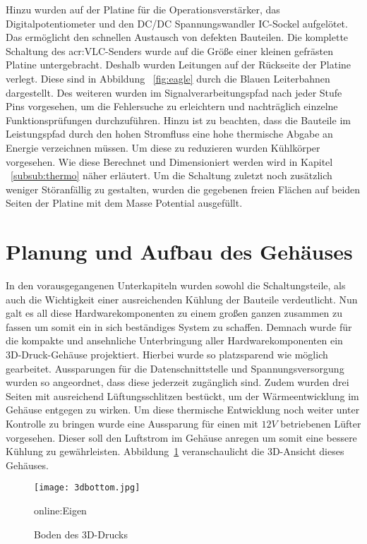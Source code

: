 Hinzu wurden auf der Platine für die Operationsverstärker, das Digitalpotentiometer und den DC/DC Spannungswandler IC-Sockel aufgelötet. Das ermöglicht den schnellen Austausch von defekten Bauteilen. Die komplette Schaltung des \gls{acr:VLC}-Senders wurde auf die Größe einer kleinen gefrästen Platine untergebracht. Deshalb wurden Leitungen auf der Rückseite der Platine verlegt. Diese sind in Abbildung ~\ref{fig:eagle} durch die Blauen Leiterbahnen dargestellt. Des weiteren wurden im Signalverarbeitungspfad nach jeder Stufe Pins vorgesehen, um die Fehlersuche zu erleichtern und nachträglich einzelne Funktionsprüfungen durchzuführen. Hinzu ist zu beachten, dass die Bauteile im Leistungspfad durch den hohen Stromfluss eine hohe thermische Abgabe an Energie verzeichnen müssen. Um diese zu reduzieren wurden Kühlkörper vorgesehen. Wie diese Berechnet und Dimensioniert werden wird in Kapitel ~\ref{subsub:thermo} näher erläutert. Um die Schaltung zuletzt noch zusätzlich weniger Störanfällig zu gestalten, wurden die gegebenen freien Flächen auf beiden Seiten der Platine mit dem Masse Potential ausgefüllt. 


\section{Planung und Aufbau des Gehäuses}
\label{sec:geh}

In den vorausgegangenen Unterkapiteln wurden sowohl die Schaltungsteile, als auch die Wichtigkeit einer ausreichenden Kühlung der Bauteile verdeutlicht. Nun galt es all diese Hardwarekomponenten zu einem großen ganzen zusammen zu fassen um somit ein in sich beständiges System zu schaffen. Demnach wurde für die kompakte und ansehnliche Unterbringung aller Hardwarekomponenten ein 3D-Druck-Gehäuse projektiert. Hierbei wurde so platzsparend wie möglich gearbeitet. Aussparungen für die Datenschnittstelle und Spannungsversorgung wurden so angeordnet, dass diese jederzeit zugänglich sind. Zudem wurden drei Seiten mit ausreichend Lüftungsschlitzen bestückt, um der Wärmeentwicklung im Gehäuse entgegen zu wirken. Um diese thermische Entwicklung noch weiter unter Kontrolle zu bringen wurde eine Aussparung für einen mit $12V$ betriebenen Lüfter vorgesehen. Dieser soll den Luftstrom im Gehäuse anregen um somit eine bessere Kühlung zu gewährleisten. Abbildung~\ref{fig:3dbottom} veranschaulicht die 3D-Ansicht dieses Gehäuses.

\begin{figure}[H]
	\centering
	\texttt{[image: 3dbottom.jpg]}
	\caption[Boden des 3D-Drucks]{Boden des 3D-Drucks} \gls{online:Eigen}
	\label{fig:3dbottom}
\end{figure}

